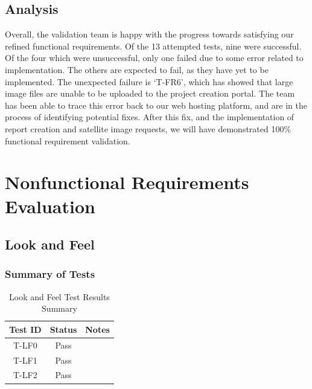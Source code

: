\documentclass[12pt, titlepage]{article}
\begin{document}
\subsection{Analysis}

Overall, the validation team is happy with the progress towards satisfying our refined functional requirements. Of the 13 attempted tests, nine were successful. Of the four which were unsuccessful,
only one failed due to some error related to implementation. The others are expected to fail, as they have yet to be implemented. The unexpected failure is `T-FR6', which has showed that large image files are unable to be uploaded to the 
project creation portal. The team has been able to trace this error back to our web hosting platform, and are in the process of identifying potential fixes. After this fix, and the implementation of report creation and satellite image requests, we will have demonstrated 100\% functional requirement validation.

\section{Nonfunctional Requirements Evaluation}
\subsection{Look and Feel}
\subsubsection{Summary of Tests}
\begin{table}[H]
    \centering
    \label{tab:test_results}
    \begin{tabular}{|c|c|l|}
        \hline
        \textbf{Test ID} & \textbf{Status} & \textbf{Notes}\\
        \hline
        T-LF0 & Pass & \\
        T-LF1 & Pass & \\
        T-LF2 & Pass & \\
        \hline
    \end{tabular}
    \caption{Look and Feel Test Results Summary}
\end{table}
    
\end{document}
